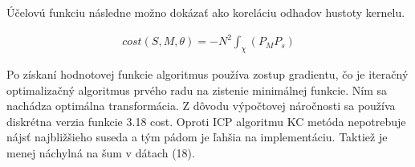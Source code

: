 Účelovú funkciu následne možno dokázať ako koreláciu odhadov hustoty kernelu.

\begin{equation}
\label{eq21}
\begin{aligned}
cost\left(S,M,\theta\right)= - N^2 \int_{\chi} \left(P_M P_s\right)
\end{aligned}
\end{equation}

Po získaní hodnotovej funkcie algoritmus používa zostup gradientu, čo je iteračný optimalizačný algoritmus prvého radu na zistenie minimálnej funkcie. Ním sa nachádza optimálna transformácia. Z dôvodu výpočtovej náročnosti sa používa diskrétna verzia funkcie 3.18 cost. Oproti ICP algoritmu KC metóda nepotrebuje nájsť najbližšieho suseda a tým pádom je ľahšia na implementáciu. Taktiež je menej náchylná na šum v dátach (18).

